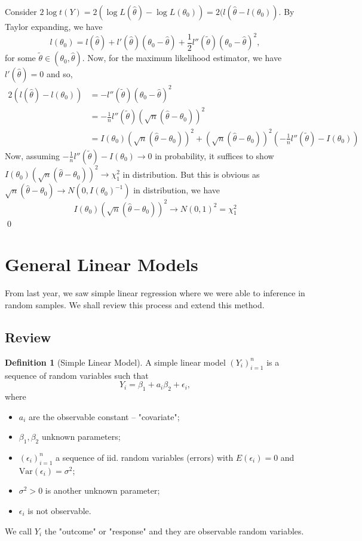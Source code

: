 \documentclass[
]{article}
\theoremstyle{definition}
\theoremstyle{definition}
\newtheorem{definition}{Definition}[section]
\begin{document}
Consider
\(2\log t(Y) = 2 (\log L(\hat{\theta}) - \log L(\theta_0)) =  2(l(\hat{\theta} - l(\theta_0))\).
By Taylor expanding, we have
\[l(\theta_0) = l(\hat{\theta}) + l'(\hat{\theta})(\theta_0 - \hat{\theta}) + 
    \frac{1}{2} l''(\tilde{\theta})(\theta_0 - \hat{\theta})^2,\] for
some \(\tilde \theta \in (\theta_0, \hat{\theta})\). Now, for the
maximum likelihood estimator, we have \(l'(\hat{\theta}) = 0\) and so,
\[\begin{split}
    2(l(\hat{\theta}) - l(\theta_0)) & = -l''(\tilde{\theta})(\theta_0 - \hat{\theta})^2 \\
    & = - \frac{1}{n}l''(\tilde \theta)(\sqrt{n}(\hat{\theta} - \theta_0))^2\\
    & = I(\theta_0)(\sqrt{n}(\hat{\theta} - \theta_0))^2 +
      (\sqrt{n}(\hat{\theta} - \theta_0))^2\left(-\frac{1}{n}l''(\tilde \theta) - I(\theta_0)\right)
  \end{split}\] Now, assuming
\(-\frac{1}{n}l''(\tilde \theta) - I(\theta_0) \to 0\) in probability,
it suffices to show
\(I(\theta_0)(\sqrt{n}(\hat{\theta} - \theta_0))^2 \to \chi_1^2\) in
distribution. But this is obvious as
\(\sqrt{n}(\hat\theta - \theta_0) \to N(0, I(\theta_0)^{-1})\) in
distribution, we have
\[I(\theta_0)(\sqrt{n}(\hat{\theta} - \theta_0))^2 \to N(0, 1)^2 = \chi_1^2\]
\qed

\newpage

\hypertarget{general-linear-models}{%
\section{General Linear Models}\label{general-linear-models}}

From last year, we saw simple linear regression where we were able to
inference in random samples. We shall review this process and extend
this method.

\hypertarget{review-1}{%
\subsection{Review}\label{review-1}}

\begin{definition}[Simple Linear Model]
  A simple linear model \((Y_i)_{i = 1}^n\) is a sequence of random variables such that 
  \[Y_i = \beta_1 + a_i \beta_2 + \epsilon_i,\]
  where 
  \begin{itemize}
    \item \(a_i\) are the observable constant -- "covariate";
    \item \(\beta_1, \beta_2\) unknown parameters;
    \item \((\epsilon_i)_{i = 1}^n\) a sequence of iid. random variables (errors)
      with \(E(\epsilon_i) = 0\) and \(\text{Var}(\epsilon_i) = \sigma^2\);
    \item \(\sigma^2 > 0\) is another unknown parameter;
    \item \(\epsilon_i\) is not observable.
  \end{itemize}
  We call \(Y_i\) the "outcome" or "response" and they are observable random 
  variables.
\end{definition}
\end{document}
